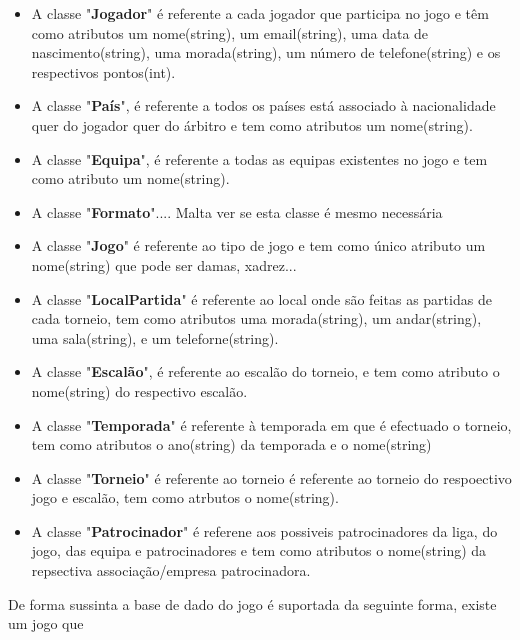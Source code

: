 \documentclass[a4paper]{article}
\begin{document}
\begin{itemize}

\item A classe "\textbf{Jogador}" é referente a cada jogador que participa no jogo e têm como atributos um nome(string), um email(string), uma data de nascimento(string), uma morada(string), um número de telefone(string) e  os respectivos pontos(int).

\item A classe "\textbf{País}", é referente a todos os países  está associado à nacionalidade quer do jogador quer do árbitro e tem como atributos um nome(string).

\item A classe "\textbf{Equipa}", é referente a todas as equipas existentes no jogo e tem como atributo um nome(string).

\item A classe "\textbf{Formato}".... Malta ver se esta classe é mesmo necessária

\item A classe "\textbf{Jogo}" é referente ao tipo de jogo e tem  como único atributo um nome(string) que pode ser damas, xadrez...

\item A classe "\textbf{LocalPartida}" é referente ao local onde são feitas as partidas de cada torneio, tem como atributos uma morada(string), um andar(string), uma sala(string), e um teleforne(string).

\item A classe "\textbf{Escalão}", é referente ao escalão do torneio, e tem como atributo o nome(string) do respectivo escalão.

\item A classe "\textbf{Temporada}" é referente à temporada em que é efectuado o torneio, tem como atributos o ano(string) da temporada e o nome(string)

\item A classe "\textbf{Torneio}" é referente ao torneio é referente ao torneio do respoectivo jogo e escalão, tem como atrbutos o nome(string).

\item A classe "\textbf{Patrocinador}" é referene aos possiveis patrocinadores da liga, do jogo, das equipa e patrocinadores e tem como atributos o nome(string) da repsectiva associação/empresa patrocinadora.
\end{itemize}

De forma sussinta a base de dado do jogo é suportada da seguinte forma, existe um jogo que 
\end{document}
